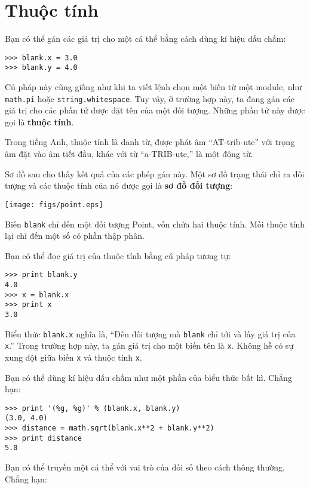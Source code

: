 \documentclass[11pt]{book}
\begin{document}


\section{Thuộc tính}


Bạn có thể gán các giá trị cho một cá thể bằng cách dùng kí hiệu dấu chấm:

\beforeverb
\begin{verbatim}
>>> blank.x = 3.0
>>> blank.y = 4.0
\end{verbatim}
\afterverb
%
Cú pháp này cũng giống như khi ta viết lệnh chọn một biến từ một 
module, như {\tt math.pi} hoặc {\tt string.whitespace}.  Tuy vậy, ở trường hợp
này, ta đang gán các giá trị cho các phần tử được đặt tên của một đối tượng.
Những phần tử này được gọi là {\bf thuộc tính}.

Trong tiếng Anh, thuộc tính là danh từ, được phát âm ``AT-trib-ute'' với trọng âm
đặt vào âm tiết đầu, khác với từ ``a-TRIB-ute,'' là một động từ.

Sơ đồ sau cho thấy kết quả của các phép gán này. Một sơ đồ trạng thái
chỉ ra đối tượng và các thuộc tính của nó được gọi là  {\bf sơ đồ đối tượng}:


\beforefig
\centerline{\texttt{[image: figs/point.eps]}}
\afterfig

Biến {\tt blank} chỉ đến một đối tượng Point, vốn
chứa hai thuộc tính. Mỗi thuộc tính lại chỉ đến một
số có phần thập phân.

Bạn có thể đọc giá trị của thuộc tính bằng cú pháp tương tự:

\beforeverb
\begin{verbatim}
>>> print blank.y
4.0
>>> x = blank.x
>>> print x
3.0
\end{verbatim}
\afterverb
%
Biểu thức {\tt blank.x} nghĩa là, ``Đến đối tượng mà {\tt blank}
chỉ tới và lấy giá trị của {\tt x}.'' Trong trường hợp này, ta gán
giá trị cho một biến tên là {\tt x}.  Không hề có sự xung đột giữa 
biến {\tt x} và thuộc tính {\tt x}.

Bạn có thể dùng kí hiệu dấu chấm như một phần của biểu thức bất kì. Chẳng hạn:

\beforeverb
\begin{verbatim}
>>> print '(%g, %g)' % (blank.x, blank.y)
(3.0, 4.0)
>>> distance = math.sqrt(blank.x**2 + blank.y**2)
>>> print distance
5.0
\end{verbatim}
\afterverb
%
Bạn có thể truyền một cá thể với vai trò của đối số theo cách thông thường.
Chẳng hạn:
\end{document}
